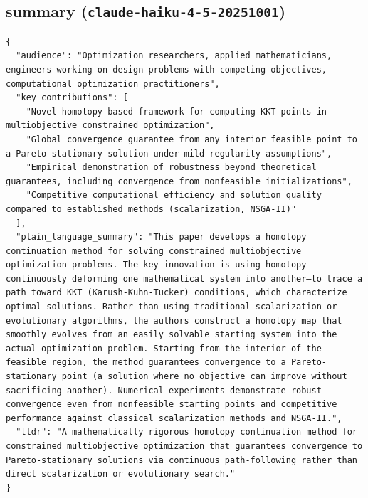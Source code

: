 \documentclass[11pt]{article}
\begin{document}
\subsection*{summary (\texttt{claude-haiku-4-5-20251001})}
\begin{verbatim}
{
  "audience": "Optimization researchers, applied mathematicians, engineers working on design problems with competing objectives, computational optimization practitioners",
  "key_contributions": [
    "Novel homotopy-based framework for computing KKT points in multiobjective constrained optimization",
    "Global convergence guarantee from any interior feasible point to a Pareto-stationary solution under mild regularity assumptions",
    "Empirical demonstration of robustness beyond theoretical guarantees, including convergence from nonfeasible initializations",
    "Competitive computational efficiency and solution quality compared to established methods (scalarization, NSGA-II)"
  ],
  "plain_language_summary": "This paper develops a homotopy continuation method for solving constrained multiobjective optimization problems. The key innovation is using homotopy—continuously deforming one mathematical system into another—to trace a path toward KKT (Karush-Kuhn-Tucker) conditions, which characterize optimal solutions. Rather than using traditional scalarization or evolutionary algorithms, the authors construct a homotopy map that smoothly evolves from an easily solvable starting system into the actual optimization problem. Starting from the interior of the feasible region, the method guarantees convergence to a Pareto-stationary point (a solution where no objective can improve without sacrificing another). Numerical experiments demonstrate robust convergence even from nonfeasible starting points and competitive performance against classical scalarization methods and NSGA-II.",
  "tldr": "A mathematically rigorous homotopy continuation method for constrained multiobjective optimization that guarantees convergence to Pareto-stationary solutions via continuous path-following rather than direct scalarization or evolutionary search."
}
\end{verbatim}
\end{document}
